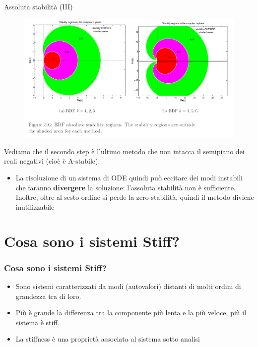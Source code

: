 \documentclass[aspectratio=169, 10pt, handout,usenames,dvipsnames]{beamer}
\begin{document}
    \begin{frame}{Assoluta stabilità (III)}
        \begin{figure}
        \centering
        \includegraphics[width=.7\linewidth]{fig7.png}
        \label{fig:my_label}
        \end{figure}
        Vediamo che il secondo step è l’ultimo metodo che non intacca il semipiano dei reali negativi (cioè è A-stabile). 
        \begin{itemize}
            \item La risoluzione di un sistema di ODE quindi può eccitare dei modi instabili che faranno \textbf{divergere} la soluzione: l'assoluta stabilità non è sufficiente. Inoltre, oltre al sesto ordine si perde la zero-stabilità, quindi il metodo diviene inutilizzabile
        \end{itemize}
    \end{frame}



\section{Cosa sono i sistemi Stiff?}\label{sec:sec1}
\begin{frame} \frametitle{Cosa sono i sistemi Stiff?}
    \begin{itemize}
        \item Sono sistemi caratterizzati da modi (autovalori) distanti di molti ordini di grandezza tra di loro. 
        \item Più è grande la differenza tra la componente più lenta e la più veloce, più il sistema è stiff.
        \item La stiffness è una proprietà associata al sistema sotto analisi
    \end{itemize}
\end{frame}
\end{document}
